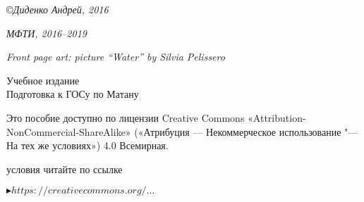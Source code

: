 \medskip
\small
\copyright \textsl{Диденко Андрей, 2016}

\medspace

\textsl{МФТИ, 2016--2019}

\medspace

\textsl{Front page art: picture ``Water'' by Silvia Pelissero }

\vspace*{7\baselineskip}

\center

{\Large Учебное издание}
\\[2\baselineskip]
{\Huge Подготовка к ГОСу по Матану}

\vspace*{\fill}

\noindent
\begin{minipage}[t]{0.61\textwidth}
\quad\small Это пособие доступно по лицензии Creative Commons «Attribution-NonCommercial-ShareAlike» («Атрибуция — Некоммерческое использование "--- На тех же условиях») 4.0 Всемирная.

 условия читайте по ссылке

\qquad\href{https://creativecommons.org/licenses/by-nc-sa/4.0/deed.ru}{\textcolor{prpl}{$\blacktriangleright https://creativecommons.org/...$}}
\end{minipage}%
\hfill%
\begin{minipage}[t]{\dimexpr(0.4\textwidth-2mm)}
\end{minipage}
